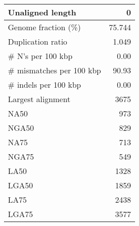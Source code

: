 \documentclass[12pt,a4paper]{article}
\begin{document}
\begin{table}[ht]
\begin{center}
\begin{tabular}{|l*{1}{|r}|}
Unaligned length & 0 \\ \hline
Genome fraction (\%) & 75.744 \\ \hline
Duplication ratio & 1.049 \\ \hline
\# N's per 100 kbp & 0.00 \\ \hline
\# mismatches per 100 kbp & 90.93 \\ \hline
\# indels per 100 kbp & 0.00 \\ \hline
Largest alignment & 3675 \\ \hline
NA50 & 973 \\ \hline
NGA50 & 829 \\ \hline
NA75 & 713 \\ \hline
NGA75 & 549 \\ \hline
LA50 & 1328 \\ \hline
LGA50 & 1859 \\ \hline
LA75 & 2438 \\ \hline
LGA75 & 3577 \\ \hline
\end{tabular}
\end{center}
\end{table}
\end{document}
